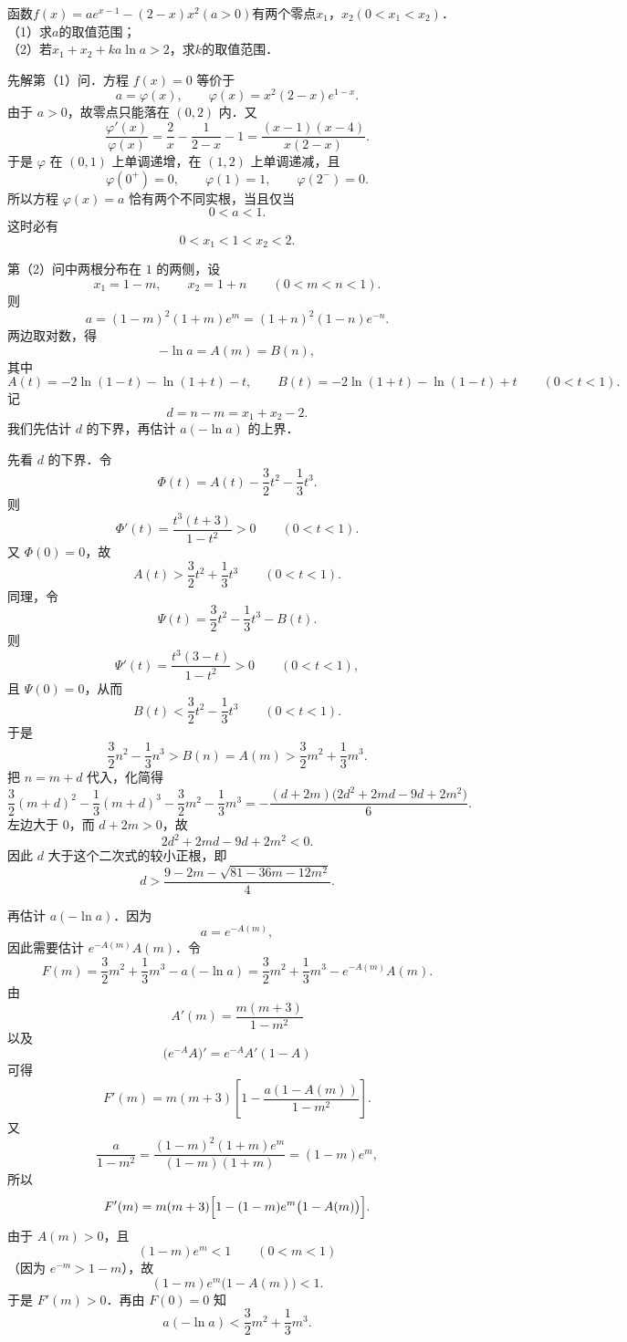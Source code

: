 \begin{example}[参数与零点题]
函数$f(x) = ae^{x-1} - (2 - x)x^2(a > 0)$有两个零点$x_1$，$x_2(0 < x_1 < x_2)$．\\
（1）求$a$的取值范围；\\
（2）若$x_1 + x_2 + ka\ln a > 2$，求$k$的取值范围．
\end{example}
\begin{solution}
先解第（1）问．方程 $f(x)=0$ 等价于
\[
a=\varphi(x),\qquad \varphi(x)=x^2(2-x)e^{1-x}.
\]
由于 $a>0$，故零点只能落在 $(0,2)$ 内．又
\[
\frac{\varphi'(x)}{\varphi(x)}
=\frac2x-\frac1{2-x}-1
=\frac{(x-1)(x-4)}{x(2-x)}.
\]
于是 $\varphi$ 在 $(0,1)$ 上单调递增，在 $(1,2)$ 上单调递减，且
\[
\varphi(0^+)=0,\qquad \varphi(1)=1,\qquad \varphi(2^-)=0.
\]
所以方程 $\varphi(x)=a$ 恰有两个不同实根，当且仅当
\[
0<a<1.
\]
这时必有
\[
0<x_1<1<x_2<2.
\]

第（2）问中两根分布在 \(1\) 的两侧，设
\[
x_1=1-m,\qquad x_2=1+n\qquad (0<m<n<1).
\]
则
\[
a=(1-m)^2(1+m)e^m=(1+n)^2(1-n)e^{-n}.
\]
两边取对数，得
\[
-\ln a=A(m)=B(n),
\]
其中
\[
A(t)=-2\ln(1-t)-\ln(1+t)-t,\qquad
B(t)=-2\ln(1+t)-\ln(1-t)+t\qquad(0<t<1).
\]
记
\[
d=n-m=x_1+x_2-2.
\]
我们先估计 $d$ 的下界，再估计 $a(-\ln a)$ 的上界．

先看 $d$ 的下界．令
\[
\Phi(t)=A(t)-\frac32 t^2-\frac13 t^3.
\]
则
\[
\Phi'(t)=\frac{t^3(t+3)}{1-t^2}>0\qquad(0<t<1).
\]
又 $\Phi(0)=0$，故
\[
A(t)>\frac32 t^2+\frac13 t^3\qquad(0<t<1).
\]
同理，令
\[
\Psi(t)=\frac32 t^2-\frac13 t^3-B(t).
\]
则
\[
\Psi'(t)=\frac{t^3(3-t)}{1-t^2}>0\qquad(0<t<1),
\]
且 $\Psi(0)=0$，从而
\[
B(t)<\frac32 t^2-\frac13 t^3\qquad(0<t<1).
\]
于是
\[
\frac32 n^2-\frac13 n^3>B(n)=A(m)>\frac32 m^2+\frac13 m^3.
\]
把 $n=m+d$ 代入，化简得
\[
\frac32 (m+d)^2-\frac13 (m+d)^3-\frac32 m^2-\frac13 m^3
=-\frac{(d+2m)\bigl(2d^2+2md-9d+2m^2\bigr)}6.
\]
左边大于 $0$，而 $d+2m>0$，故
\[
2d^2+2md-9d+2m^2<0.
\]
因此 $d$ 大于这个二次式的较小正根，即
\[
d>\frac{9-2m-\sqrt{81-36m-12m^2}}4. \tag{1}
\]

再估计 $a(-\ln a)$．因为
\[
a=e^{-A(m)},
\]
因此需要估计 $e^{-A(m)}A(m)$．令
\[
F(m)=\frac32 m^2+\frac13 m^3-a(-\ln a)
=\frac32 m^2+\frac13 m^3-e^{-A(m)}A(m).
\]
由
\[
A'(m)=\frac{m(m+3)}{1-m^2}
\]
以及
\[
\bigl(e^{-A}A\bigr)'=e^{-A}A'(1-A)
\]
可得
\[
F'(m)=m(m+3)\left[1-\frac{a(1-A(m))}{1-m^2}\right].
\]
又
\[
\frac{a}{1-m^2}=\frac{(1-m)^2(1+m)e^m}{(1-m)(1+m)}=(1-m)e^m,
\]
所以
\[
F'(m)=m(m+3)\Bigl[1-(1-m)e^m\bigl(1-A(m)\bigr)\Bigr].
\]
由于 $A(m)>0$，且
\[
(1-m)e^m<1\qquad(0<m<1)
\]
（因为 $e^{-m}>1-m$），故
\[
(1-m)e^m\bigl(1-A(m)\bigr)<1.
\]
于是 $F'(m)>0$．再由 $F(0)=0$ 知
\[
a(-\ln a)<\frac32 m^2+\frac13 m^3. \tag{2}
\]


\end{solution}

